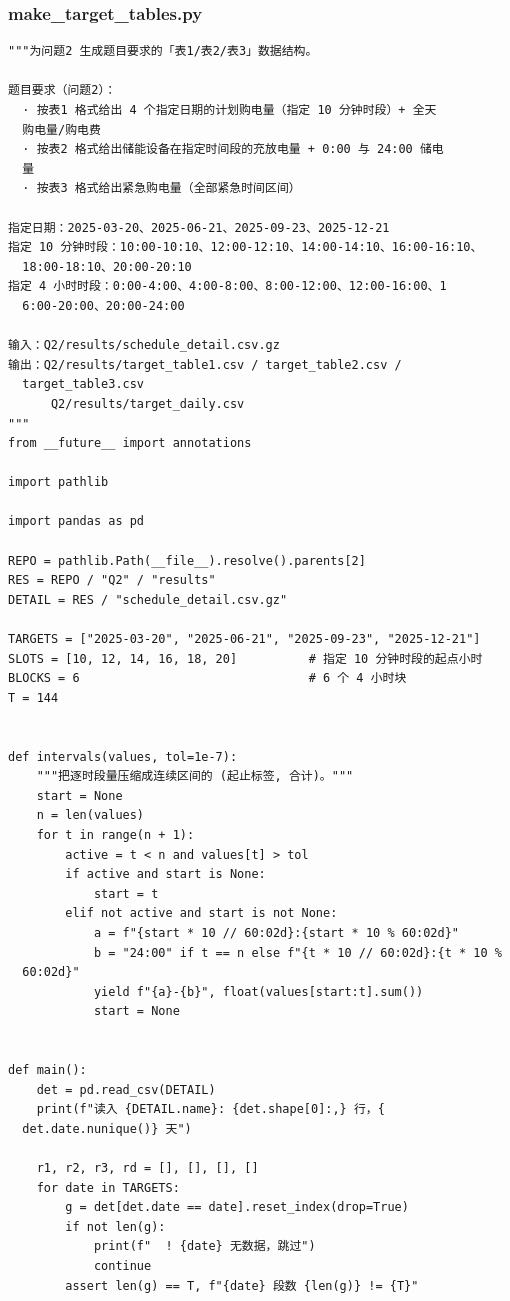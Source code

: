 \subsubsection*{make\_target\_tables.py}
\begin{verbatim}
"""为问题2 生成题目要求的「表1/表2/表3」数据结构。

题目要求（问题2）：
  · 按表1 格式给出 4 个指定日期的计划购电量（指定 10 分钟时段）+ 全天
  购电量/购电费
  · 按表2 格式给出储能设备在指定时间段的充放电量 + 0:00 与 24:00 储电
  量
  · 按表3 格式给出紧急购电量（全部紧急时间区间）

指定日期：2025-03-20、2025-06-21、2025-09-23、2025-12-21
指定 10 分钟时段：10:00-10:10、12:00-12:10、14:00-14:10、16:00-16:10、
  18:00-18:10、20:00-20:10
指定 4 小时时段：0:00-4:00、4:00-8:00、8:00-12:00、12:00-16:00、1
  6:00-20:00、20:00-24:00

输入：Q2/results/schedule_detail.csv.gz
输出：Q2/results/target_table1.csv / target_table2.csv /
  target_table3.csv
      Q2/results/target_daily.csv
"""
from __future__ import annotations

import pathlib

import pandas as pd

REPO = pathlib.Path(__file__).resolve().parents[2]
RES = REPO / "Q2" / "results"
DETAIL = RES / "schedule_detail.csv.gz"

TARGETS = ["2025-03-20", "2025-06-21", "2025-09-23", "2025-12-21"]
SLOTS = [10, 12, 14, 16, 18, 20]          # 指定 10 分钟时段的起点小时
BLOCKS = 6                                # 6 个 4 小时块
T = 144


def intervals(values, tol=1e-7):
    """把逐时段量压缩成连续区间的 (起止标签, 合计)。"""
    start = None
    n = len(values)
    for t in range(n + 1):
        active = t < n and values[t] > tol
        if active and start is None:
            start = t
        elif not active and start is not None:
            a = f"{start * 10 // 60:02d}:{start * 10 % 60:02d}"
            b = "24:00" if t == n else f"{t * 10 // 60:02d}:{t * 10 %
  60:02d}"
            yield f"{a}-{b}", float(values[start:t].sum())
            start = None


def main():
    det = pd.read_csv(DETAIL)
    print(f"读入 {DETAIL.name}: {det.shape[0]:,} 行，{
  det.date.nunique()} 天")

    r1, r2, r3, rd = [], [], [], []
    for date in TARGETS:
        g = det[det.date == date].reset_index(drop=True)
        if not len(g):
            print(f"  ! {date} 无数据，跳过")
            continue
        assert len(g) == T, f"{date} 段数 {len(g)} != {T}"


\end{verbatim}
